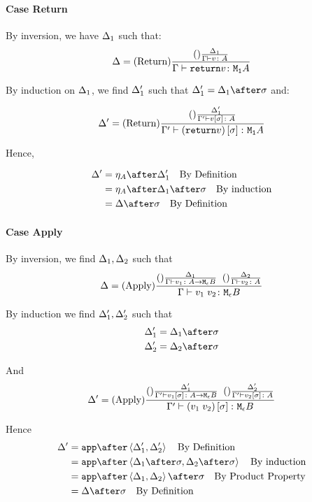 \documentclass{report}
\begin{document}
\paragraph{Case Return}

By inversion, we have $\Delta_1$ such that:
\begin{equation}
    \Delta = (\text{Return}) \frac{(\text{}) \frac{\Delta_1}{\Gamma \vdash v \colon A}}{\Gamma \vdash \texttt{return} v \colon \texttt{M}_{\texttt{1}}{A}}
\end{equation}

By induction on $\Delta_1$, we find $\Delta_1'$ such that $\D_1' = \D_1\after\si$ and:

\begin{equation}
    \Delta' = (\text{Return}) \frac{(\text{}) \frac{\Delta_1'}{\Gamma' \vdash v\left[\sigma\right] \colon A}}{\Gamma' \vdash (\texttt{return} v)\left[\sigma\right] \colon \texttt{M}_{\texttt{1}}{A}}
\end{equation}

Hence,

\begin{align}
    \D' & = \point{A}\after\D_1'\qt{By Definition}\\
    & = \point{A}\after\D_1\after\si\qt{By induction}\\
    & = \D\after\si\qt{By Definition}\\
\end{align}
\paragraph{Case Apply}
By inversion, we find $\Delta_1, \Delta_2$ such that
\begin{equation}
    \Delta = (\text{Apply}) \frac{(\text{}) \frac{\Delta_1}{\Gamma \vdash v_1 \colon A \rightarrow \texttt{M}_{\epsilon}{B}}\;\;(\text{}) \frac{\Delta_2}{\Gamma \vdash v_2 \colon A}}{\Gamma \vdash v_1\; v_2 \colon \texttt{M}_{\epsilon}{B}}
\end{equation}

By induction we find $\Delta_1', \Delta_2'$ such that 
\begin{align}
    \D_1' &= \D_1\after\si\\
    \D_2' &= \D_2\after\si\\
\end{align}

And
\begin{equation}
    \Delta' = (\text{Apply}) \frac{(\text{}) \frac{\Delta_1'}{\Gamma' \vdash v_1\left[\sigma\right] \colon A \rightarrow \texttt{M}_{\epsilon}{B}}\;\;(\text{}) \frac{\Delta_2'}{\Gamma' \vdash v_2\left[\sigma\right] \colon A}}{\Gamma' \vdash (v_1\; v_2)\left[\sigma\right] \colon \texttt{M}_{\epsilon}{B}}
\end{equation}

Hence
\begin{align}
    \D' &= \app\after\pr{\D_1'}{\D_2'}\qt{By Definition}\\
        &= \app\after\pr{\D_1\after\si}{\D_2\after\si}\qt{By induction}\\
        &= \app\after\pr{\D_1}{\D_2}\after\si\qt{By Product Property}\\
        & = \D\after\si\qt{By Definition}\\
\end{align}
\end{document}
